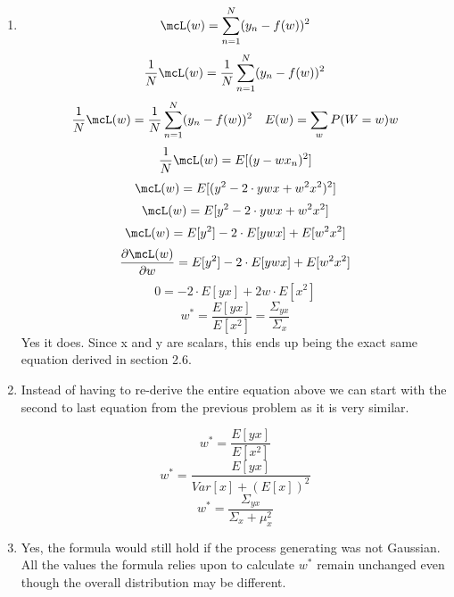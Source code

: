 \documentclass[submit]{harvardml}
\begin{document}
\begin{enumerate}
    \bigskip
    \item
    \begin{equation*}
        \mcL(w) = \sum_{n = 1}^{N} (y_n - f(w))^2
    \end{equation*}
    \begin{equation*}
        \frac{1}{N}\mcL(w) = \frac{1}{N}\sum_{n = 1}^{N} (y_n - f(w))^2
    \end{equation*}
    \begin{align*}
        \frac{1}{N} \mcL(w) = \frac{1}{N} \sum_{n = 1}^{N} (y_n - f(w))^2 &&
        E(w) = \sum_{w} P(W = w) w
    \end{align*}
    \begin{equation*}
        \frac{1}{N}\mcL(w) = E[(y - wx_n)^2]
    \end{equation*}
    \begin{equation*}
        \mcL(w) = E[(y^2 - 2 \cdot y w x + w^2x^2)^2]
    \end{equation*}
    \begin{equation*}
        \mcL(w) = E[y^2 - 2 \cdot y w x + w^2x^2]
    \end{equation*}
    \begin{equation*}
        \mcL(w) = E[y^2] - 2 \cdot E[y w x] + E[w^2x^2]
    \end{equation*}
    \begin{equation*}
        \frac{\partial \mcL(w)}{\partial w} = E[y^2] - 2 \cdot E[y w x] + E[w^2x^2]
    \end{equation*}
    \begin{equation*}
        0 = -2 \cdot E[yx] + 2w \cdot E[x^2]
    \end{equation*}
    \begin{equation*}
        w^* = \frac{E[yx]}{E[x^2]} = \frac{\Sigma_{yx}}{\Sigma_{x}}
    \end{equation*}
    Yes it does. Since x and y are scalars, this ends up being the exact same equation derived in section 2.6.
    
    \bigskip
    \item
    Instead of having to re-derive the entire equation above we can start with the second to last equation from the previous problem as it is very similar.
    
    \begin{equation*}
        w^* = \frac{E[yx]}{E[x^2]}
    \end{equation*}
    \begin{equation*}
        w^* = \frac{E[yx]}{Var[x] + (E[x])^2}
    \end{equation*}
    \begin{equation*}
        w^* = \frac{\Sigma_{yx}}{\Sigma_{x} + \mu_x^2}
     \end{equation*}
    
    \bigskip
    \item
    Yes, the formula would still hold if the process generating was not Gaussian. All the values the formula relies upon to calculate $w^*$ remain unchanged even though the overall distribution may be different. 
\end{enumerate}
\end{document}

